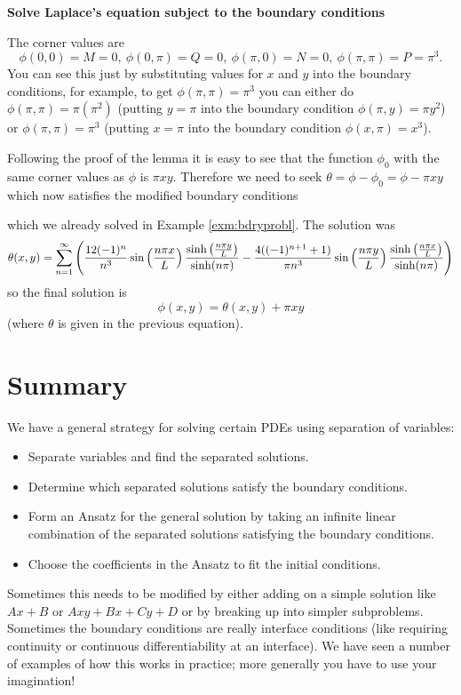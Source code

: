 \begin{exm}
{\bf Solve Laplace's equation subject to the boundary conditions}


The corner values are
\[\phi(0,0)=M=0,\ \phi(0,\pi)=Q=0,\ \phi(\pi,0)=N=0,\ \phi(\pi,\pi)=P=\pi^3.\]
You can see this just by substituting values for $x$ and $y$ into the boundary conditions, for example, to get $\phi(\pi,\pi)=\pi^3$ you can either do $\phi(\pi,\pi)=\pi(\pi^2)$ (putting $y=\pi$ into the boundary condition $\phi(\pi,y)=\pi y^2$) or $\phi(\pi,\pi)=\pi^3$ (putting $x=\pi$ into the boundary condition $\phi(x,\pi)=x^3$).

Following the proof of the lemma it is easy to see that the function $\phi_0$ with the same corner values as $\phi$ is $\pi xy$. Therefore we need to seek $\theta=\phi-\phi_0=\phi-\pi xy$ which now satisfies the modified boundary conditions


which we already solved in Example \ref{exm:bdryprobl}. The solution was
\[\theta(x,y)=\sum_{n=1}^{\infty}\left(\frac{12(-1)^n}{n^3}\sin\left(\frac{n \pi x}{L}\right)\frac{\sinh\left(\frac{n\pi y}{L}\right)}{\sinh(n\pi)}-\frac{4((-1)^{n+1}+1)}{\pi n^3}\sin\left(\frac{n\pi y}{L}\right)\frac{\sinh\left(\frac{n\pi x}{L}\right)}{\sinh(n\pi)}\right)\]
so the final solution is
\[\phi(x,y)=\theta(x,y)+\pi xy\]
(where $\theta$ is given in the previous equation).
\end{exm}

\section{Summary}

We have a general strategy for solving certain PDEs using separation of variables:

\begin{itemize}
\item Separate variables and find the separated solutions.
\item Determine which separated solutions satisfy the boundary conditions.
\item Form an Ansatz for the general solution by taking an infinite linear combination of the separated solutions satisfying the boundary conditions.
\item Choose the coefficients in the Ansatz to fit the initial conditions.
\end{itemize}

Sometimes this needs to be modified by either adding on a simple solution like $Ax+B$ or $Axy+Bx+Cy+D$  or by breaking up into simpler subproblems. Sometimes the boundary conditions are really interface conditions (like requiring continuity or continuous differentiability at an interface). We have seen a number of examples of how this works in practice; more generally you have to use your imagination!